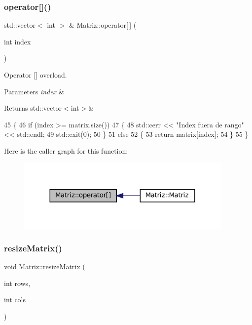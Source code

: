 \subsubsection{\texorpdfstring{operator[]()}{operator[]()}}
{\footnotesize\ttfamily std\+::vector$<$ int $>$ \& Matriz\+::operator\mbox{[}$\,$\mbox{]} (\begin{DoxyParamCaption}\item[{int}]{index }\end{DoxyParamCaption})}



Operator \mbox{[}\mbox{]} overload. 


\begin{DoxyParams}{Parameters}
{\em index} & \\
\hline
\end{DoxyParams}
\begin{DoxyReturn}{Returns}
std\+::vector$<$int$>$\& 
\end{DoxyReturn}

\begin{DoxyCode}
45 \{
46   \textcolor{keywordflow}{if} (index >= matrix.size())
47   \{
48     std::cerr << \textcolor{stringliteral}{"Index fuera de rango"} << std::endl;
49     std::exit(0);
50   \}
51   \textcolor{keywordflow}{else}
52   \{
53     \textcolor{keywordflow}{return} matrix[index];
54   \}
55 \}
\end{DoxyCode}
Here is the caller graph for this function\+:
\nopagebreak
\begin{figure}[H]
\begin{center}
\leavevmode
\includegraphics[width=300pt]{classMatriz_ad2adc857ff1738ebfb7fe42de408737b_icgraph}
\end{center}
\end{figure}
\mbox{\label{classMatriz_aa929f933e9088dc0efecaa9a46d555d9}} 
\subsubsection{\texorpdfstring{resize\+Matrix()}{resizeMatrix()}}
{\footnotesize\ttfamily void Matriz\+::resize\+Matrix (\begin{DoxyParamCaption}\item[{int}]{rows,  }\item[{int}]{cols }\end{DoxyParamCaption})}



